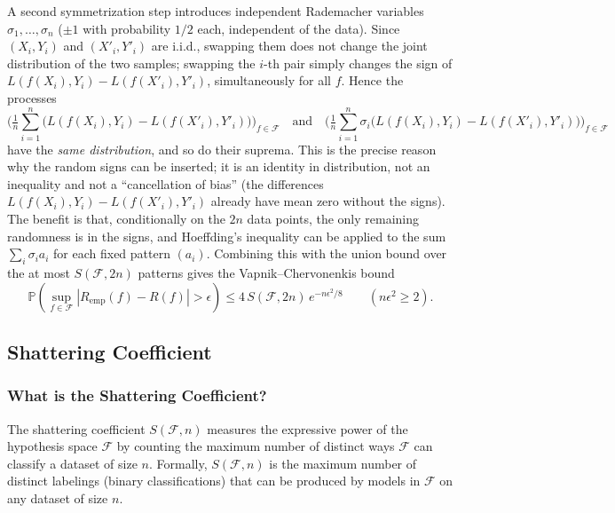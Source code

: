 \begin{notechapter}
A second symmetrization step introduces independent Rademacher variables $\sigma_1, \dots, \sigma_n$
($\pm 1$ with probability $1/2$ each, independent of the data). Since $(X_i,Y_i)$ and $(X'_i,Y'_i)$ are i.i.d.,
swapping them does not change the joint distribution of the two samples; swapping the $i$-th pair simply
changes the sign of $L(f(X_i), Y_i) - L(f(X'_i), Y'_i)$, simultaneously for all $f$. Hence the processes
\[
\Big( \tfrac{1}{n} \sum_{i=1}^n \big(L(f(X_i), Y_i) - L(f(X'_i), Y'_i)\big) \Big)_{f \in \mathcal{F}}
\quad\text{and}\quad
\Big( \tfrac{1}{n} \sum_{i=1}^n \sigma_i \big(L(f(X_i), Y_i) - L(f(X'_i), Y'_i)\big) \Big)_{f \in \mathcal{F}}
\]
have the \emph{same distribution}, and so do their suprema. This is the precise reason why the random signs
can be inserted; it is an identity in distribution, not an inequality and not a ``cancellation of bias''
(the differences $L(f(X_i),Y_i) - L(f(X'_i),Y'_i)$ already have mean zero without the signs). The benefit is
that, conditionally on the $2n$ data points, the only remaining randomness is in the signs, and
Hoeffding's inequality can be applied to the sum $\sum_i \sigma_i a_i$ for each fixed pattern
$(a_i)$. Combining this with the union bound over the at most $S(\mathcal{F}, 2n)$ patterns gives the
Vapnik--Chervonenkis bound
\[
\mathbb{P}\left( \sup_{f \in \mathcal{F}} |R_{\text{emp}}(f) - R(f)| > \epsilon \right) \leq 4\, S(\mathcal{F}, 2n)\, e^{-n\epsilon^2/8}
\qquad (n\epsilon^2 \geq 2).
\]

\subsection{Shattering Coefficient}

\subsubsection{What is the Shattering Coefficient?}
The shattering coefficient \( S(\mathcal{F}, n) \) measures the expressive power of the hypothesis space \( \mathcal{F} \) by counting the maximum number of distinct ways \( \mathcal{F} \) can classify a dataset of size \( n \). Formally, \( S(\mathcal{F}, n) \) is the maximum number of distinct labelings (binary classifications) that can be produced by models in \( \mathcal{F} \) on any dataset of size \( n \).


\end{notechapter}
